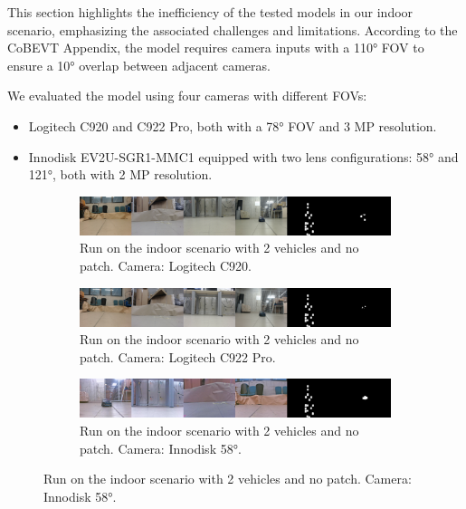 This section highlights the inefficiency of the tested models in our indoor scenario, emphasizing the associated challenges and limitations.  
According to the CoBEVT Appendix, the model requires camera inputs with a 110° FOV to ensure a 10° overlap between adjacent cameras.  

We evaluated the model using four cameras with different FOVs:  
\begin{itemize}
    \item Logitech C920 and C922 Pro, both with a 78° FOV and 3 MP resolution.  
    \item Innodisk EV2U-SGR1-MMC1\cite{Innodisk_EV2U-SGR1-MMC1} equipped with two lens configurations: 58° and 121°, both with 2 MP resolution.  
\end{itemize}

\begin{figure}[tph]
    \centering
    \begin{subfigure}[b]{1\textwidth}
        \centering
        \includegraphics[width=\textwidth]{figures/results/0000_c920.png}
        \caption{Run on the indoor scenario with 2 vehicles and no patch. Camera: Logitech C920.}
        \label{fig:indoor_c920}
    \end{subfigure}
    \vspace{0.5cm}

    \begin{subfigure}[b]{1\textwidth}
        \centering
        \includegraphics[width=\textwidth]{figures/results/0000_c922pro.png}
        \caption{Run on the indoor scenario with 2 vehicles and no patch. Camera: Logitech C922 Pro.}
        \label{fig:indoor_c922pro}
    \end{subfigure}
    \vspace{0.5cm}

    \begin{subfigure}[b]{1\textwidth}
        \centering
        \includegraphics[width=\textwidth]{figures/results/0000_innodisk58.png}
        \caption{Run on the indoor scenario with 2 vehicles and no patch. Camera: Innodisk 58°.}
        \label{fig:indoor_innodisk58}
    \end{subfigure}
    \vspace{0.5cm}


\end{figure}

